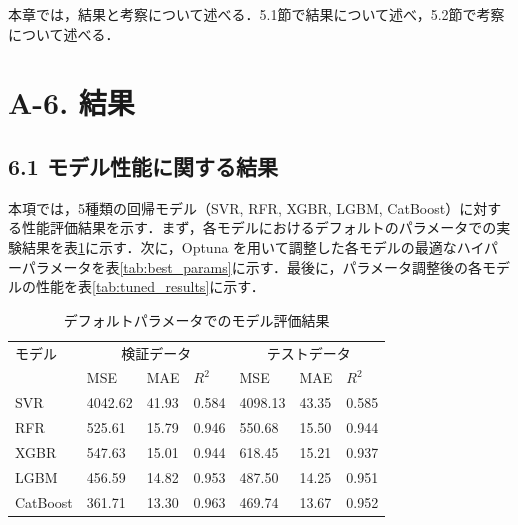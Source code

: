本章では，結果と考察について述べる．5.1節で結果について述べ，5.2節で考察について述べる．

\section*{A-6. 結果}

\subsection*{6.1 モデル性能に関する結果}
本項では，5種類の回帰モデル（SVR, RFR, XGBR, LGBM, CatBoost）に対する性能評価結果を示す．まず，各モデルにおけるデフォルトのパラメータでの実験結果を表\ref{tab:default_results}に示す．次に，Optuna を用いて調整した各モデルの最適なハイパーパラメータを表\ref{tab:best_params}に示す．最後に，パラメータ調整後の各モデルの性能を表\ref{tab:tuned_results}に示す．
\begin{table}[htbp]
    \centering
    \doublerulesep=0.3pt
    \caption{デフォルトパラメータでのモデル評価結果}
    \label{tab:default_results}
    \begin{tabular}{l|p{0.8cm}p{0.8cm}p{0.8cm}|p{0.8cm}p{0.8cm}p{0.8cm}}
        \hline\hline\hline
        モデル & \multicolumn{3}{c|}{検証データ} & \multicolumn{3}{c}{テストデータ} \\
               & MSE & MAE & $R^2$ & MSE & MAE & $R^2$ \\
        \hline
        SVR       & 4042.62 & 41.93 & 0.584 & 4098.13 & 43.35 & 0.585 \\
        RFR       & 525.61  & 15.79 & 0.946 & 550.68  & 15.50 & 0.944 \\
        XGBR      & 547.63  & 15.01 & 0.944 & 618.45  & 15.21 & 0.937 \\
        LGBM      & 456.59  & 14.82 & 0.953 & 487.50  & 14.25 & 0.951 \\
        CatBoost  & 361.71  & 13.30 & 0.963 & 469.74  & 13.67 & 0.952 \\
        \hline\hline\hline
    \end{tabular}
\end{table}

